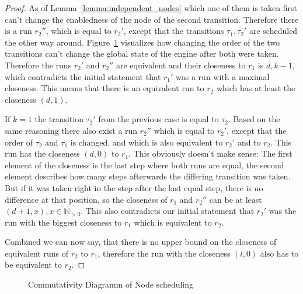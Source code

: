\begin{proof}
As of Lemma~\ref{lemma:independent_nodes} which one of them is taken first can't change the enabledness of the node of the second transition.
Therefore there is a run \(r_2''\), which is equal to \(r_2'\), except that the transitions \(\tau_1, \tau_2'\) are scheduled the other way around.
Figure~\ref{fig:chap3:sec_sync:commutativity_scheduling} visualizes how changing the order of the two transitions can't change the global state of the engine after both were taken.
Therefore the runs \(r_2'\) and \(r_2''\) are equivalent and their closeness to \(r_1\) is \(d, k-1\), which contradicts the initial statement that \(r_1'\) was a run with a maximal closeness.
This means that there is an equivalent run to \(r_2\) which has at least the closeness \((d, 1)\).

If \(k = 1\) the transition \(\tau_2'\) from the previous case is equal to \(\tau_2\).
Based on the same reasoning there also exist a run \(r_2''\) which is equal to \(r_2'\), except that the order of \(\tau_2\) and \(\tau_1\) is changed, and which is also equivalent to \(r_2'\) and to \(r_2\).
This run has the closeness \((d, 0)\) to \(r_1\).
This obviously doesn't make sense: The first element of the closeness is the last step where both runs are equal, the second element describes how many steps afterwards the differing transition was taken.
But if it was taken right in the step after the last equal step, there is no difference at that position, so the closeness of \(r_1\) and \(r_2''\) can be at least \((d+1, x), x \in \mathbb{N}_{>0}\).
This also contradicts our initial statement that \(r_2'\) was the run with the biggest closeness to \(r_1\) which is equivalent to \(r_2\).

Combined we can now say, that there is no upper bound on the closeness of equivalent runs of \(r_2\) to \(r_1\), therefore the run with the closeness \((l, 0)\) also has to be equivalent to \(r_2\).

\end{proof}


\begin{figure}
  \caption{Commutativity Diagramm of Node scheduling}
\label{fig:chap3:sec_sync:commutativity_scheduling}
\end{figure}



